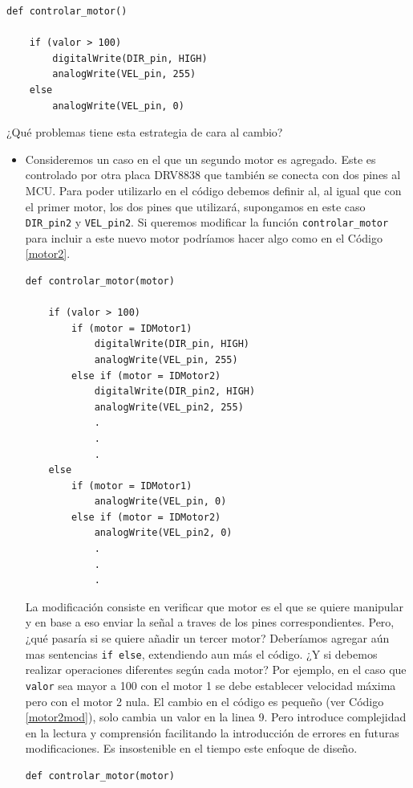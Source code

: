 \begin{lstlisting}[caption=Ejemplo uso del motor DC.,label={listingMotor}]
def controlar_motor()

	if (valor > 100)
    	digitalWrite(DIR_pin, HIGH)
	    analogWrite(VEL_pin, 255)
	else
	    analogWrite(VEL_pin, 0)

\end{lstlisting}

¿Qué problemas tiene esta estrategia de cara al cambio?
\begin{itemize}
	\item Consideremos un caso en el que un segundo motor es agregado. Este es controlado por otra placa \gls{DRV8838} que también se conecta con dos pines al \gls{MCU}. Para poder utilizarlo en el código debemos definir al, al igual que con el primer motor, los dos pines que utilizará, supongamos en este caso \verb|DIR_pin2| y \verb|VEL_pin2|. Si queremos modificar la función \verb|controlar_motor| para incluir a este nuevo motor podríamos hacer algo como en el Código \ref{motor2}.
	
\begin{lstlisting}[caption=Extención de la función controlar\_motor para controlar dos motores.,label={motor2}]
def controlar_motor(motor)

	if (valor > 100)
		if (motor = IDMotor1)
    		digitalWrite(DIR_pin, HIGH)
	    	analogWrite(VEL_pin, 255)
	    else if (motor = IDMotor2)
	    	digitalWrite(DIR_pin2, HIGH)
	    	analogWrite(VEL_pin2, 255)
	    	.
	    	.
	    	.
	else
		if (motor = IDMotor1)
	    	analogWrite(VEL_pin, 0)
	    else if (motor = IDMotor2)
	    	analogWrite(VEL_pin2, 0)
	    	.
	    	.
	    	.

\end{lstlisting}
	
La modificación consiste en verificar que motor es el que se quiere manipular y en base a eso enviar la señal a traves de los pines correspondientes. Pero, ¿qué pasaría si se quiere añadir un tercer motor? Deberíamos agregar aún mas sentencias \verb|if else|, extendiendo aun más el código. ¿Y si debemos realizar operaciones diferentes según cada motor? Por ejemplo, en el caso que \verb|valor| sea mayor a 100 con el motor 1 se debe establecer velocidad máxima pero con el motor 2 nula. El cambio en el código es pequeño (ver Código \ref{motor2mod}), solo cambia un valor en la linea 9. Pero introduce complejidad en la lectura y comprensión facilitando la introducción de errores en futuras modificaciones. Es insostenible en el tiempo este enfoque de diseño.
\begin{lstlisting}[caption=Modificación de la función controlar\_motor para cambiar comportamiento al utilizar el motor 2.,label={motor2mod}]
def controlar_motor(motor)


\end{lstlisting}
\end{itemize}
